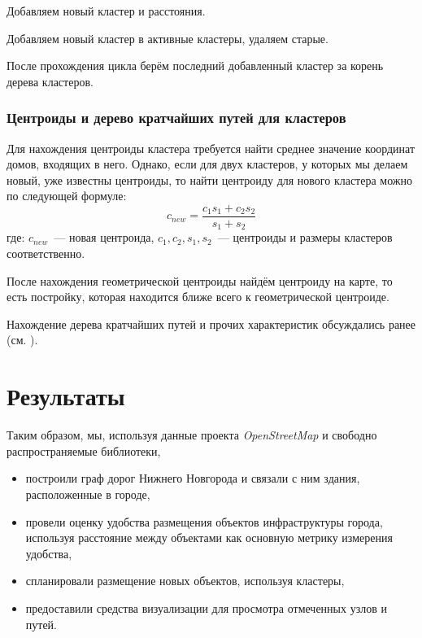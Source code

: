 \documentclass[11pt]{article}
\begin{document}
	Добавляем новый кластер и расстояния.
	
	

	Добавляем новый кластер в активные кластеры, удаляем старые.
	
	

	После прохождения цикла берём последний добавленный кластер за корень дерева кластеров.
	
	

	\subsubsection{Центроиды и дерево кратчайших путей для кластеров}

	Для нахождения центроиды кластера требуется найти среднее значение координат домов, входящих в него. 
	Однако, если для двух кластеров, у которых мы делаем новый, уже известны центроиды, то найти центроиду для нового кластера можно по следующей формуле:
	\[
		c_{new} = \frac{c_1 s_1 + c_2 s_2}{s_1 + s_2}
	\] 
	где: $c_{new}$~--- новая центроида, $c_1, c_2, s_1, s_2$~--- центроиды и размеры кластеров соответственно.

	После нахождения геометрической центроиды найдём центроиду на карте, то есть постройку, которая находится ближе всего к геометрической центроиде.

	

	Нахождение дерева кратчайших путей и прочих характеристик обсуждались ранее (см. ).

    \section{Результаты}\label{section:results}
    
    Таким образом, мы, используя данные проекта \textit{OpenStreetMap} и свободно распространяемые библиотеки,
	\begin{itemize}
	\item построили граф дорог Нижнего Новгорода и связали с ним здания, расположенные в городе,
	\item провели оценку удобства размещения объектов инфраструктуры города, используя расстояние между объектами как основную метрику измерения удобства,
	\item спланировали размещение новых объектов, используя кластеры,
	\item предоставили средства визуализации для просмотра отмеченных узлов и путей.
	\end{itemize}
	
\end{document}
